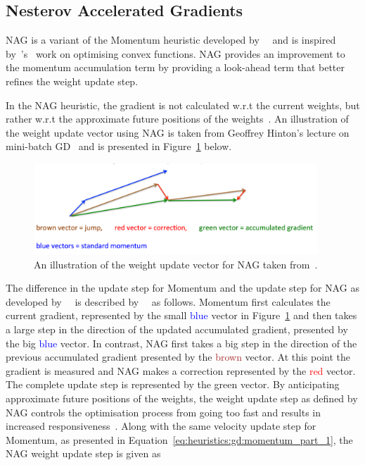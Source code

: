 \subsection{Nesterov Accelerated Gradients}\label{sec:heuristics:nag}

\Acf{NAG} is a variant of the \acs{Momentum} heuristic developed by~\citeauthor{ref:sutskever:2013}~\cite{ref:sutskever:2013} and is inspired by~\citeauthor{ref:nesterov:1983}'s~\cite{ref:nesterov:1983} work on optimising convex functions. \acs{NAG} provides an improvement to the momentum accumulation term by providing a look-ahead term that better refines the weight update step.

In the \acs{NAG} heuristic, the gradient is not calculated w.r.t the current weights, but rather w.r.t the approximate future positions of the weights~\cite{ref:sutskever:2013, ref:ruder:2016}. An illustration of the weight update vector using \acs{NAG} is taken from Geoffrey Hinton's lecture on mini-batch \acs{GD}~\cite{ref:hinton:2012} and is presented in Figure~\ref{fig:heuristics:gd:nag} below.

\begin{figure}[htbp]
      \centering
      \includegraphics[width=0.95\textwidth]{images/nag.pdf}
      \caption{An illustration of the weight update vector for \acf{NAG} taken from~\cite{ref:hinton:2012}.}
      \label{fig:heuristics:gd:nag}
\end{figure}

The difference in the update step for \acs{Momentum} and the update step for \acs{NAG} as developed by~\citeauthor{ref:sutskever:2013}~\cite{ref:sutskever:2013} is described by~\citeauthor{ref:ruder:2016}~\cite{ref:ruder:2016} as follows. \acs{Momentum} first calculates the current gradient, represented by the small \textcolor{blue}{blue} vector in Figure~\ref{fig:heuristics:gd:nag} and then takes a large step in the direction of the updated accumulated gradient, presented by the big \textcolor{blue}{blue} vector. In contrast, \acs{NAG} first takes a big step in the direction of the previous accumulated gradient presented by the \textcolor{brown}{brown} vector. At this point the gradient is measured and \acs{NAG} makes a correction represented by the \textcolor{red}{red} vector. The complete update step is represented by the green vector. By anticipating approximate future positions of the weights, the weight update step as defined by \acs{NAG} controls the optimisation process from going too fast and results in increased responsiveness~\cite{ref:bengio:2013}. Along with the same velocity update step for \acs{Momentum}, as presented in Equation~\eqref{eq:heuristics:gd:momentum_part_1}, the \acs{NAG} weight update step is given as


